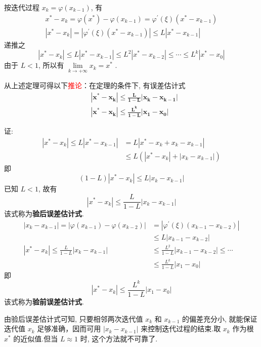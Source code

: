 按迭代过程 $ x_{k}=\varphi\left(x_{k-1}\right) $, 有
$$
\begin{array}{c}
x^{*}-x_{k}=\varphi\left(x^{*}\right)-\varphi\left(x_{k-1}\right)=\varphi^{\prime}(\xi)\left(x^{*}-x_{k-1}\right) \\
\left|x^{*}-x_{k}\right|=\left|\varphi^{\prime}(\xi)\left(x^{*}-x_{k-1}\right)\right| \leqslant L\left|x^{*}-x_{k-1}\right|
\end{array}
$$
递推之
$$
\left|x^{*}-x_{k}\right| \leqslant L\left|x^{*}-x_{k-1}\right| \leqslant L^{2}\left|x^{*}-x_{k-2}\right| \leqslant \cdots \leqslant L^{k}\left|x^{*}-x_{0}\right|
$$
由于 $ L<1 $, 所以有 $ \lim\limits _{k \rightarrow+\infty} x_{k}=x^{*} $ .

从上述定理可得以下\textcolor{red}{推论}：在定理的条件下, 有误差估计式
$$\boxed{
\begin{aligned}
&\bm{\left|x^{*}-x_{k}\right| \leqslant \frac{L}{1-L}\left|x_{k}-x_{k-1}\right|} \\
&\bm{\left|x^{*}-x_{k}\right| \leqslant \frac{L^{k}}{1-L}\left|x_{1}-x_{0}\right|}
\end{aligned}}
$$

证:
$$
\begin{aligned}
\left|x^{*}-x_{k}\right|  \leqslant L\left|x^{*}-x_{k-1}\right|&=L\left|x^{*}-x_{k}+x_{k}-x_{k-1}\right| \\
& \leqslant L\left(\left|x^{*}-x_{k}\right|+\left|x_{k}-x_{k-1}\right|\right)
\end{aligned}
$$
即
$$
(1-L)\left|x^{*}-x_{k}\right| \leqslant L\left|x_{k}-x_{k-1}\right|
$$
已知 $ L<1 $, 故有
$$
\left|x^{*}-x_{k}\right| \leqslant \frac{L}{1-L}\left|x_{k}-x_{k-1}\right|
$$
该式称为\textbf{验后误差估计式}.
$$
\begin{aligned}
\left|x_{k}-x_{k-1}\right|=\left|\varphi\left(x_{k-1}\right)-\varphi\left(x_{k-2}\right)\right|&=\left|\varphi^{\prime}(\xi)\left(x_{k-1}-x_{k-2}\right)\right| \\
&\leqslant L\left|x_{k-1}-x_{k-2}\right| \\
\left|x^{*}-x_{k}\right| \leqslant \frac{L}{1-L}\left|x_{k}-x_{k-1}\right| &\leqslant \frac{L^{2}}{1-L}\left|x_{k-1}-x_{k-2}\right| \leqslant \cdots \\
&\leqslant \frac{L^{k}}{1-L}\left|x_{1}-x_{0}\right|
\end{aligned}
$$
即$$\left|x^{*}-x_{k}\right| \leqslant \frac{L^{k}}{1-L}\left|x_{1}-x_{0}\right|$$
该式称为\textbf{验前误差估计式}.

由验后误差估计式可知, 只要相邻两次迭代值 $ x_{k} $ 和 $ x_{k-1} $ 的偏差充分小, 就能保证迭代值 $ x_{k} $ 足够准确，因而可用 $ \left|x_{k}-x_{k-1}\right| $ 来控制迭代过程的结束.取 $ x_{k} $ 作为根 $ x^{*} $ 的近似值.但当 $ L \approx 1 $ 时, 这个方法就不可靠了.

